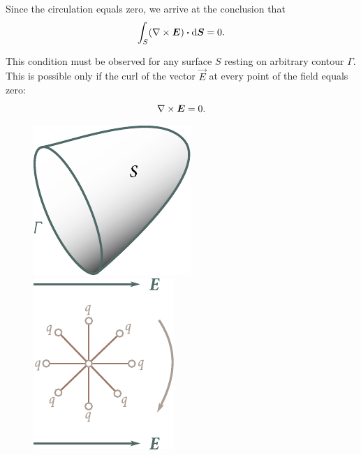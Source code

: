 \noindent
Since the circulation equals zero, we arrive at the conclusion that
\begin{equation*}
	\int_S (\nabla\times\boldsymbol{E}) \boldsymbol{\cdot} \mathrm{d}\boldsymbol{S} = 0.
\end{equation*}

\noindent
This condition must be observed for any surface $S$ resting on arbitrary contour $\Gamma$. This is possible only if the curl of the vector $\vec{E}$ at every point of the field equals zero:
\vspace{-12pt}
\begin{equation}\label{eq:1_112}
	\nabla\times\boldsymbol{E} = 0.
\end{equation}

\begin{figure}[t]
	\begin{minipage}[t]{0.5\linewidth}
		\begin{center}
			\includegraphics[scale=0.95]{figures/ch_01/fig_1_32.pdf}
			\caption[]{}
			\label{fig:1_32}
		\end{center}
	\end{minipage}
	\hspace{-0.1cm}
	\begin{minipage}[t]{0.5\linewidth}
		\begin{center}
			\includegraphics[scale=0.95]{figures/ch_01/fig_1_33.pdf}
			\caption[]{}
			\label{fig:1_33}
		\end{center}
	\end{minipage}
\vspace{-0.4cm}
\end{figure}

